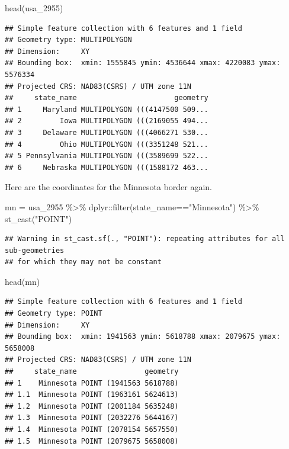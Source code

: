 \documentclass[
]{book}
\newenvironment{Shaded}{\begin{snugshade}}{\end{snugshade}}
\newcommand{\FunctionTok}[1]{\textcolor[rgb]{0.00,0.00,0.00}{#1}}
\newcommand{\NormalTok}[1]{#1}
\newcommand{\OtherTok}[1]{\textcolor[rgb]{0.56,0.35,0.01}{#1}}
\newcommand{\SpecialCharTok}[1]{\textcolor[rgb]{0.00,0.00,0.00}{#1}}
\newcommand{\StringTok}[1]{\textcolor[rgb]{0.31,0.60,0.02}{#1}}
\begin{document}
\begin{Shaded}
\begin{Highlighting}[]
\FunctionTok{head}\NormalTok{(usa\_2955)}
\end{Highlighting}
\end{Shaded}

\begin{verbatim}
## Simple feature collection with 6 features and 1 field
## Geometry type: MULTIPOLYGON
## Dimension:     XY
## Bounding box:  xmin: 1555845 ymin: 4536644 xmax: 4220083 ymax: 5576334
## Projected CRS: NAD83(CSRS) / UTM zone 11N
##     state_name                       geometry
## 1     Maryland MULTIPOLYGON (((4147500 509...
## 2         Iowa MULTIPOLYGON (((2169055 494...
## 3     Delaware MULTIPOLYGON (((4066271 530...
## 4         Ohio MULTIPOLYGON (((3351248 521...
## 5 Pennsylvania MULTIPOLYGON (((3589699 522...
## 6     Nebraska MULTIPOLYGON (((1588172 463...
\end{verbatim}

Here are the coordinates for the Minnesota border again.

\begin{Shaded}
\begin{Highlighting}[]
\NormalTok{mn }\OtherTok{=}\NormalTok{ usa\_2955 }\SpecialCharTok{\%\textgreater{}\%}
\NormalTok{  dplyr}\SpecialCharTok{::}\FunctionTok{filter}\NormalTok{(state\_name}\SpecialCharTok{==}\StringTok{"Minnesota"}\NormalTok{) }\SpecialCharTok{\%\textgreater{}\%}
  \FunctionTok{st\_cast}\NormalTok{(}\StringTok{"POINT"}\NormalTok{)}
\end{Highlighting}
\end{Shaded}

\begin{verbatim}
## Warning in st_cast.sf(., "POINT"): repeating attributes for all sub-geometries
## for which they may not be constant
\end{verbatim}

\begin{Shaded}
\begin{Highlighting}[]
\FunctionTok{head}\NormalTok{(mn)}
\end{Highlighting}
\end{Shaded}

\begin{verbatim}
## Simple feature collection with 6 features and 1 field
## Geometry type: POINT
## Dimension:     XY
## Bounding box:  xmin: 1941563 ymin: 5618788 xmax: 2079675 ymax: 5658008
## Projected CRS: NAD83(CSRS) / UTM zone 11N
##     state_name                geometry
## 1    Minnesota POINT (1941563 5618788)
## 1.1  Minnesota POINT (1963161 5624613)
## 1.2  Minnesota POINT (2001184 5635248)
## 1.3  Minnesota POINT (2032276 5644167)
## 1.4  Minnesota POINT (2078154 5657550)
## 1.5  Minnesota POINT (2079675 5658008)
\end{verbatim}
\end{document}
